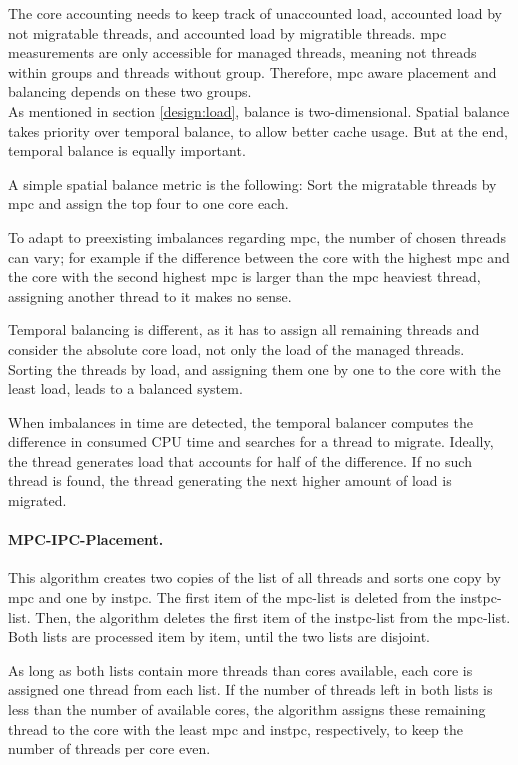 The core accounting needs to keep track of unaccounted load, accounted load by
not migratable threads, and accounted load by migratible threads.
\Gls{mpc} measurements are only accessible for managed threads, meaning not
threads within groups and threads without group.
Therefore, \gls{mpc} aware placement and balancing depends on these two
groups.
\\

As mentioned in section \ref{design:load}, balance is two-dimensional.
Spatial balance takes priority over temporal balance, to allow better cache usage.
But at the end, temporal balance is equally important.

A simple spatial balance metric is the following: Sort the migratable threads by
\gls{mpc} and assign the top four to one core each.

To adapt to preexisting imbalances regarding \gls{mpc},  the number of chosen
threads can vary; for example if the difference between the core with the
highest \gls{mpc} and the core with the second highest \gls{mpc} is larger than
the \gls{mpc} heaviest thread, assigning another thread to it makes no sense.

Temporal balancing is different, as it has to assign all remaining threads and
consider the absolute core load, not only the load of the managed threads.
Sorting the threads by load, and assigning them one by one to the
core with the least load, leads to a balanced system.

When imbalances in time are detected, the temporal balancer computes the
difference in consumed CPU time and searches for a thread to migrate.
Ideally, the thread generates load that accounts for half of the difference.
If no such thread is found, the thread generating the next higher amount of
load is migrated.


\paragraph{MPC-IPC-Placement.}
This algorithm creates two copies of the list of all threads and sorts one copy
by \gls{mpc} and one by \gls{instpc}.
The first item of the \gls{mpc}-list is deleted from the
\gls{instpc}-list.
Then, the algorithm deletes the first item of the  \gls{instpc}-list from the
\gls{mpc}-list.
Both lists are processed item by item, until the two lists are disjoint.

As long as both lists contain more threads than cores available, each core
is assigned one thread from each list.
If the number of threads left in both lists is less than the number of
available cores,
the algorithm assigns these remaining thread to the core with the least
\gls{mpc} and \gls{instpc}, respectively, to keep the number of threads per
core even.

